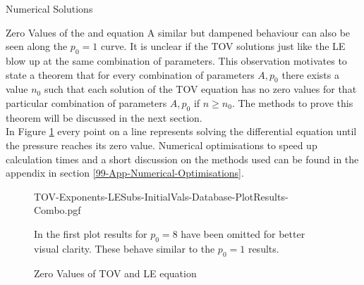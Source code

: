 \begin{section}{Numerical Solutions}
\begin{subsection}{Zero Values of the  and  equation}
A similar but dampened behaviour can also be seen along the $p_0=1$ curve.
It is unclear if the \ac{TOV} solutions just like the \ac{LE} blow up at the same combination of parameters.
This observation motivates to state a theorem that for every combination of parameters $A,p_0$ there exists a value $n_0$ such that each solution of the TOV equation has no zero values for that particular combination of parameters $A,p_0$ if $n\geq n_0$.
The methods to prove this theorem will be discussed in the next section.\\
In Figure \ref{4-NumSol-Plt-TOV-Exponents-Combo} every point on a line represents solving the differential equation until the pressure reaches its zero value.
Numerical optimisations to speed up calculation times and a short discussion on the methods used can be found in the appendix in section \ref{99-App-Numerical-Optimisations}.
\begin{figure}[H]
	\centering
	{TOV-Exponents-LESubs-InitialVals-Database-PlotResults-Combo.pgf}
	\caption{Zero Values of TOV and LE equation}
	\label{4-NumSol-Plt-TOV-Exponents-Combo}
	In the first plot results for $p_0=8$ have been omitted for better visual clarity.
	These behave similar to the $p_0=1$ results.
\end{figure}
\end{subsection}
%
%
\end{section}
